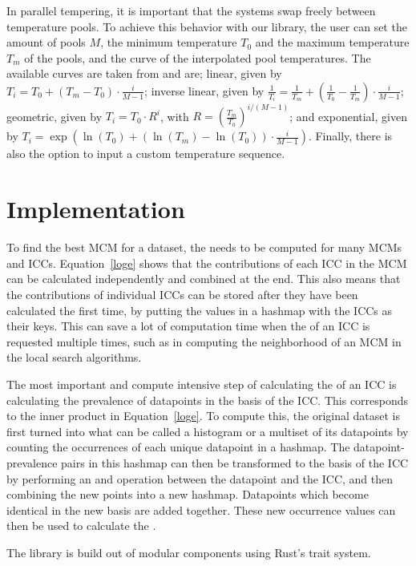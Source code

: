 In parallel tempering, it is important that the systems swap freely between temperature pools. To achieve this behavior with our library, the user can set the amount of pools \(M\), the minimum temperature \(T_0\) and the maximum temperature \(T_m\) of the pools, and the curve of the interpolated pool temperatures. The available curves are taken from \citet{parallelTemperingSwapprob} and are; linear, given by \(T_i = T_0 + (T_m - T_0) \cdot \frac{i}{M-1}\); inverse linear, given by \(\frac{1}{T_i} = \frac{1}{T_m} + \left( \frac{1}{T_0} - \frac{1}{T_m} \right) \cdot \frac{i}{M-1} \); geometric, given by \( T_i = T_0 \cdot R^i \), with \(R = \left(\frac{T_m}{T_0}\right)^{i/(M-1)}\); and exponential, given by \(T_i = \exp(\ln(T_0) + (\ln(T_m) - \ln(T_0)) \cdot \frac{i}{M-1})\). Finally, there is also the option to input a custom temperature sequence.

\section{Implementation}
To find the best MCM for a dataset, the \loge{} needs to be computed for many MCMs and ICCs. Equation~\ref{loge} shows that the contributions of each ICC in the MCM can be calculated independently and combined at the end. This also means that the \loge{} contributions of individual ICCs can be stored after they have been calculated the first time, by putting the \loge{} values in a hashmap with the ICCs as their keys. This can save a lot of computation time when the \loge{} of an ICC is requested multiple times, such as in computing the neighborhood of an MCM in the local search algorithms.

The most important and compute intensive step of calculating the \loge{} of an ICC is calculating the prevalence of datapoints in the basis of the ICC. This corresponds to the inner product in Equation~\ref{loge}. To compute this, the original dataset is first turned into what can be called a histogram or a multiset of its datapoints by counting the occurrences of each unique datapoint in a hashmap. The datapoint-prevalence pairs in this hashmap can then be transformed to the basis of the ICC by performing an and operation between the datapoint and the ICC, and then combining the new points into a new hashmap. Datapoints which become identical in the new basis are added together. These new occurrence values can then be used to calculate the \loge{}. 


The library is build out of modular components using Rust's trait system.
